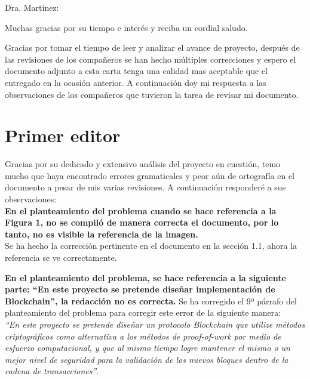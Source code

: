 \documentclass[10pt,a4paper,roman]{moderncv}        %
\begin{document}
\date{\today}
\opening{Dra. Martinez:}
\closing{Muchas gracias por su tiempo e interés y reciba un cordial saludo.}
\makelettertitle

Gracias por tomar el tiempo de leer y analizar el avance de proyecto, después de las revisiones de los compañeros se han hecho múltiples correcciones y espero el documento adjunto a esta carta tenga una calidad mas aceptable que el entregado en la ocasión anterior. A continuación doy mi respuesta a las observaciones de los compañeros que tuvieron la tarea de revisar mi documento.




\section*{Primer editor}

Gracias por su dedicado y extensivo análisis del proyecto en cuestión, temo mucho que haya encontrado errores gramaticales y peor aún de ortografía en el documento a pesar de mis varias revisiones. A continuación responderé a sus observaciones:\\
\hfill \break
\textbf{En el planteamiento del problema cuando se hace referencia a la Figura 1, no se compiló de manera correcta el documento, por lo tanto, no es visible la referencia de la imagen.}\\
\hfill \break
Se ha hecho la corrección pertinente en el documento en la sección 1.1, ahora la referencia se ve correctamente.


\textbf{En el planteamiento del problema, se hace referencia a la siguiente parte: “En este proyecto se pretende diseñar implementación de Blockchain”, la redacción no es correcta.}
\hfill \break
\hfill \break
Se ha corregido el 9º párrafo del planteamiento del problema para corregir este error de la siguiente manera:\\
\hfill \break
\textit{``En este proyecto se pretende diseñar un protocolo Blockchain que utilize  métodos criptográficos como alternativa a los métodos de proof-of-work por medio de esfuerzo computacional, y que al mismo tiempo logre mantener el mismo o un mejor nivel de seguridad para la validación de los nuevos bloques dentro de la cadena de transacciones''}.
\end{document}
